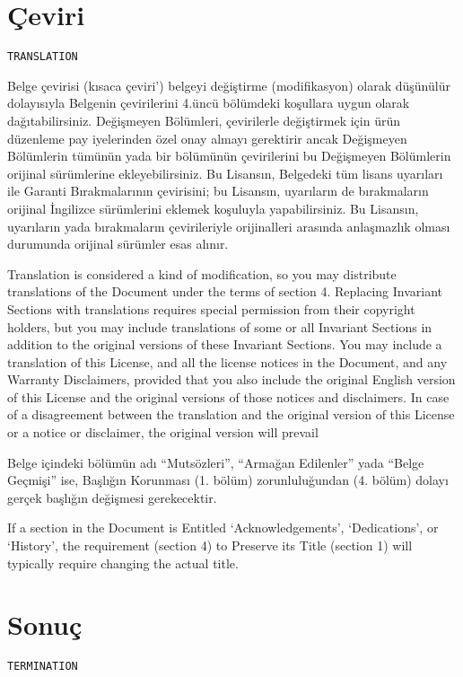 \begin{multicols}{2}
\section{Çeviri}\hfill\begin{verbatim}TRANSLATION\end{verbatim}\label{gfdl-8}

Belge çevirisi (kısaca çeviri') belgeyi değiştirme (modifikasyon) olarak düşünülür dolayısıyla Belgenin çevirilerini 4.üncü bölümdeki koşullara uygun olarak dağıtabilirsiniz. Değişmeyen Bölümleri, çevirilerle değiştirmek için ürün düzenleme pay iyelerinden  özel onay almayı gerektirir ancak Değişmeyen Bölümlerin tümünün yada bir bölümünün çevirilerini bu Değişmeyen Bölümlerin orijinal sürümlerine ekleyebilirsiniz.
Bu Lisansın, Belgedeki tüm lisans uyarıları ile Garanti Bırakmalarının çevirisini; bu Lisansın, uyarıların de bırakmaların orijinal İngilizce sürümlerini eklemek koşuluyla yapabilirsiniz. Bu Lisansın, uyarıların yada bırakmaların çevirileriyle orijinalleri arasında anlaşmazlık olması durumunda orijinal sürümler esas alınır.
\begin{ingliz}Translation is considered a kind of modification, so you
may distribute translations of the Document under the terms of
section 4. Replacing Invariant Sections with translations
requires special permission from their copyright holders, but
you may include translations of some or all Invariant Sections
in addition to the original versions of these Invariant
Sections.  You may include a translation of this License, and
all the license notices in the Document, and any Warranty
Disclaimers, provided that you also include the original
English version of this License and the original versions of
those notices and disclaimers.  In case of a disagreement
between the translation and the original version of this
License or a notice or disclaimer, the original version will
prevail\end{ingliz}

Belge içindeki bölümün adı ``Mutsözleri'', ``Armağan Edilenler''  yada ``Belge Geçmişi'' ise, Başlığın Korunması (1. bölüm) zorunluluğundan (4. bölüm) dolayı gerçek başlığın değişmesi gerekecektir.
\begin{ingliz}If a section in the Document is Entitled
`Acknowledgements', `Dedications',
or `History', the requirement (section 4) to
Preserve its Title (section 1) will typically require changing
the actual title.
\end{ingliz}

\section{Sonuç}\hfill\begin{verbatim}TERMINATION\end{verbatim}\label{gfdl-9}


\end{multicols}

